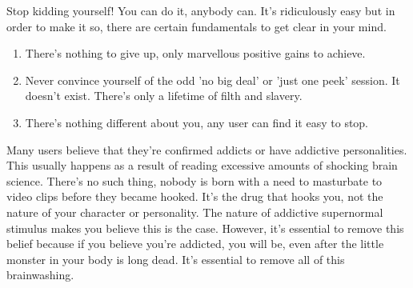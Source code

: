 \documentclass[easypeasy.tex]{subfiles}
\begin{document}
Stop kidding yourself! You can do it, anybody can. It's ridiculously easy but in order to make it so, there are certain fundamentals to get clear in your mind.

\begin{enumerate}
  \item There's nothing to give up, only marvellous positive gains to achieve.
  \item Never convince yourself of the odd 'no big deal' or 'just one peek' session. It doesn't exist. There's only a lifetime of filth and slavery.
  \item There's nothing different about you, any user can find it easy to stop.
\end{enumerate}

Many users believe that they're confirmed addicts or have addictive personalities. This usually happens as a result of reading excessive amounts of shocking brain science. There's no such thing, nobody is born with a need to masturbate to video clips before they became hooked. It's the drug that hooks you, not the nature of your character or personality. The nature of addictive supernormal stimulus makes you believe this is the case. However, it's essential to remove this belief because if you believe you're addicted, you will be, even after the little monster in your body is long dead. It's essential to remove all of this brainwashing.
\end{document}
